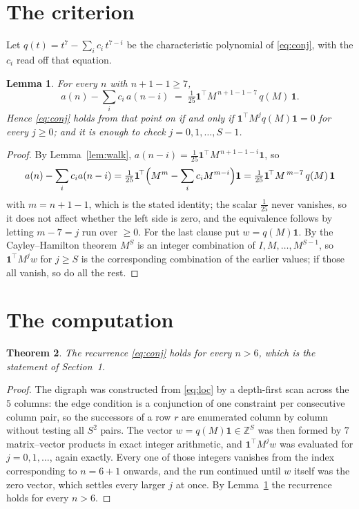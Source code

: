 \documentclass[11pt,a4paper]{article}
\theoremstyle{plain}
\newtheorem{theorem}{Theorem}
\newtheorem{lemma}[theorem]{Lemma}
\theoremstyle{definition}
\begin{document}
\section{The criterion}

Let $q(t)=t^{7}-\sum_i c_i\,t^{7-i}$ be the characteristic polynomial of
\eqref{eq:conj}, with the $c_i$ read off that equation.

\begin{lemma}\label{lem:crit}
For every $n$ with $n+1-1\ge7$,
\[
a(n)-\sum_i c_i\,a(n-i)\;=\;\tfrac1{25}\mathbf{1}^{\!\top}M^{\,n+1-1-7}\,q(M)\,\mathbf{1} .
\]
Hence \eqref{eq:conj} holds from that point on if and only if
$\mathbf{1}^{\!\top}M^{j}q(M)\mathbf{1}=0$ for every $j\ge0$; and it is enough to check
$j=0,1,\dots,S-1$.
\end{lemma}

\begin{proof}
By Lemma~\ref{lem:walk}, $a(n-i)=\tfrac1{25}\mathbf{1}^{\!\top}M^{\,n+1-1-i}\mathbf{1}$, so
\[
a(n)-\sum_i c_i a(n-i)
=\tfrac1{25}\mathbf{1}^{\!\top}\Bigl(M^{m}-\sum_i c_i M^{m-i}\Bigr)\mathbf{1}
=\tfrac1{25}\mathbf{1}^{\!\top}M^{\,m-7}\,q(M)\,\mathbf{1}
\]
with $m=n+1-1$, which is the stated identity; the scalar $\tfrac1{25}$ never vanishes, so it does not affect whether the left side is zero, and the equivalence follows by letting
$m-7=j$ run over $\ge0$. For the last clause put $w=q(M)\mathbf{1}$. By the
Cayley--Hamilton theorem $M^{S}$ is an integer combination of $I,M,\dots,M^{S-1}$, so
$\mathbf{1}^{\!\top}M^{j}w$ for $j\ge S$ is the corresponding combination of the earlier
values; if those all vanish, so do all the rest.
\end{proof}

\section{The computation}

\begin{theorem}
The recurrence \eqref{eq:conj} holds for every $n>6$, which is the statement of
Section~1.
\end{theorem}

\begin{proof}
The digraph was constructed from \eqref{eq:loc} by a depth-first scan across the $5$
columns: the edge condition is a conjunction of one constraint per consecutive column
pair, so the successors of a row $r$ are enumerated column by column without testing all
$S^2$ pairs. The vector $w=q(M)\mathbf{1}\in\mathbb{Z}^{S}$ was then formed by $7$
matrix--vector products in exact integer arithmetic, and $\mathbf{1}^{\!\top}M^{j}w$ was
evaluated for $j=0,1,\dots$, again exactly. Every one of those integers vanishes from the
index corresponding to $n=6+1$ onwards, and the run continued until $w$ itself was the
zero vector, which settles every larger $j$ at once. By Lemma~\ref{lem:crit} the recurrence
holds for every $n>6$.
\end{proof}
\end{document}
